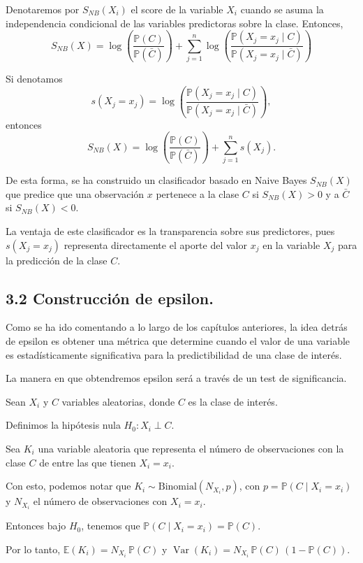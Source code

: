 \documentclass[
 12pt,
 letterpaper,
]{article}
\theoremstyle{teoremaBreak}
\theoremstyle{plain}
\theoremstyle{definition}
\begin{document}
Denotaremos por $S_{NB}(X_i)$ el score de la variable $X_i$ cuando se asuma la independencia condicional de las variables predictoras sobre la clase.
Entonces,
\[
S_{NB}(X) = \log\left(\dfrac{\mathbb{P}(C)}{\mathbb{P}(\bar{C})}\right)
+ \sum_{j = 1}^n \log\left(\dfrac{\mathbb{P}(X_j = x_j \mid C)}{\mathbb{P}(X_j = x_j \mid \bar{C})}\right)
\]

Si denotamos
\[
s(X_j = x_j) = \log\left(\dfrac{\mathbb{P}(X_j = x_j \mid C)}{\mathbb{P}(X_j = x_j \mid \bar{C})}\right),
\]
entonces
\[
S_{NB}(X) = \log\left(\dfrac{\mathbb{P}(C)}{\mathbb{P}(\bar{C})}\right) + \sum_{j = 1}^n s(X_j).
\]

De esta forma, se ha construido un clasificador basado en Naive Bayes $S_{NB}(X)$ que predice que una observación $x$ pertenece a la clase $C$ si $S_{NB}(X) > 0$ y a $\bar{C}$ si $S_{NB}(X) < 0$.

La ventaja de este clasificador es la transparencia sobre sus predictores, pues $s(X_j = x_j)$ representa directamente el aporte del valor $x_j$ en la variable $X_j$ para la predicción de la clase $C$.

\subsection{3.2 Construcción de
epsilon.}\label{construcciuxf3n-de-epsilon.}

Como se ha ido comentando a lo largo de los capítulos anteriores, la
idea detrás de epsilon es obtener una métrica que determine cuando el
valor de una variable es estadísticamente significativa para la
predictibilidad de una clase de interés.

La manera en que obtendremos epsilon será a través de un test de
significancia.

Sean $X_i$ y $C$ variables aleatorias, donde $C$ es la clase de interés.

Definimos la hipótesis nula $H_0: X_i \perp C$.

Sea $K_i$ una variable aleatoria que representa el número de observaciones con
la clase $C$ de entre las que tienen $X_i = x_i$.

Con esto, podemos notar que $K_i \sim \text{Binomial}(N_{X_i}, p)$, con
$p = \mathbb{P}(C \mid X_i = x_i)$ y $N_{X_i}$ el número de observaciones con $X_i=x_i$.

Entonces bajo $H_0$, tenemos que $\mathbb{P}(C \mid X_i = x_i) = \mathbb{P}(C)$.

Por lo tanto, $\mathbb{E}(K_i) = N_{X_i}\,\mathbb{P}(C)$ y $\operatorname{Var}(K_i) = N_{X_i}\,\mathbb{P}(C)\,(1 -
\mathbb{P}(C))$.
\end{document}
